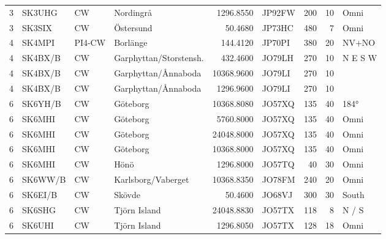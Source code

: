 {\begin{landscape}
\begin{longtable}{rlllrlrrl}
	                 3 & SK3UHG     & CW      & Nordingrå              &    1296.8550 & JP92FW      &      200 &       10 & Omni         \\
	                 3 & SK3SIX     & CW      & Östersund              &      50.4680 & JP73HC      &      480 &        7 & Omni         \\
	                 4 & SK4MPI     & PI4-CW  & Borlänge               &     144.4120 & JP70PI      &      380 &       20 & NV+NO        \\
	                 4 & SK4BX/B    & CW      & Garphyttan/Storstensh. &     432.4600 & JO79LH      &      270 &       10 & N E S W      \\
	                 4 & SK4BX/B    & CW      & Garphyttan/Ånnaboda    &   10368.9600 & JO79LI      &      270 &       10 &              \\
	                 4 & SK4BX/B    & CW      & Garphyttan/Ånnaboda    &    1296.9600 & JO79LI      &      270 &       10 &              \\
	                 6 & SK6YH/B    & CW      & Göteborg               &   10368.8080 & JO57XQ      &      135 &       40 & 184°         \\
	                 6 & SK6MHI     & CW      & Göteborg               &    5760.8000 & JO57XQ      &      135 &       40 & Omni         \\
	                 6 & SK6MHI     & CW      & Göteborg               &   24048.8000 & JO57XQ      &      135 &       40 & Omni         \\
	                 6 & SK6MHI     & CW      & Göteborg               &   10368.8000 & JO57XQ      &      135 &       40 & Omni         \\
	                 6 & SK6MHI     & CW      & Hönö                   &    1296.8000 & JO57TQ      &       40 &       30 & Omni         \\
	                 6 & SK6WW/B    & CW      & Karlsborg/Vaberget     &   10368.8350 & JO78FM      &      240 &       20 & Omni         \\
	                 6 & SK6EI/B    & CW      & Skövde                 &      50.4600 & JO68VJ      &      300 &       30 & South        \\
	                 6 & SK6SHG     & CW      & Tjörn Island           &   24048.8830 & JO57TX      &      118 &        8 & N / S        \\
	                 6 & SK6UHI     & CW      & Tjörn Island           &    1296.8050 & JO57TX      &      128 &       18 & Omni         \\

\end{longtable}
\end{landscape}}
